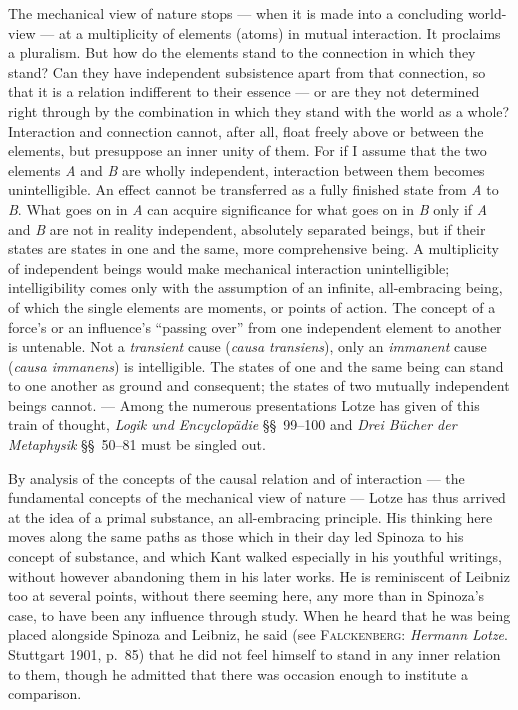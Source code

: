 \documentclass[12pt,a4paper]{book}
\newcommand{\opage}[1]{\marginnote{\footnotesize\textit{[#1]}}}
\begin{document}
The mechanical view of nature stops --- when it is made \opage{515}into a concluding
world-view --- at a multiplicity of elements (atoms) in mutual interaction. It
proclaims a pluralism. But how do the elements stand to the connection in which
they stand? Can they have independent subsistence apart from that connection, so
that it is a relation indifferent to their essence --- or are they not determined
right through by the combination in which they stand with the world as a whole?
Interaction and connection cannot, after all, float freely above or between the
elements, but presuppose an inner unity of them. For if I assume that the two
elements \textit{A} and \textit{B} are wholly independent, interaction between
them becomes unintelligible. An effect cannot be transferred as a fully finished
state from \textit{A} to \textit{B}. What goes on in \textit{A} can acquire
significance for what goes on in \textit{B} only if \textit{A} and \textit{B} are
not in reality independent, absolutely separated beings, but if their states are
states in one and the same, more comprehensive being. A multiplicity of
independent beings would make mechanical interaction unintelligible;
intelligibility comes only with the assumption of an infinite, all-embracing
being, of which the single elements are moments, or points of action. The
concept of a force's or an influence's ``passing over'' from one independent
element to another is untenable. Not a \emph{transient} cause (\textit{causa
transiens}), only an \emph{immanent} cause (\textit{causa immanens}) is
intelligible. The states of one and the same being can stand to one another as
ground and consequent; the states of two mutually independent beings cannot. ---
Among the numerous presentations Lotze has given of this train of thought,
\textit{Logik und Encyclopädie} §§~99--100 and \textit{Drei Bücher der
Metaphysik} §§~50--81 must be singled out.

By analysis of the concepts of the causal relation and of interaction --- the
fundamental concepts of the mechanical view of nature --- Lotze has thus arrived
at the idea of a primal substance, an all-embracing principle. His thinking here
moves along the same paths as those which in their day led Spinoza to his concept
of substance, and which Kant walked especially in his youthful writings, without
however abandoning them in his later works. He is reminiscent of Leibniz too at
several points, without there seeming here, any more \opage{516}than in Spinoza's case, to
have been any influence through study. When he heard that he was being placed
alongside Spinoza and Leibniz, he said (see \textsc{Falckenberg}:
\textit{Hermann Lotze}. Stuttgart 1901, p.~85) that he did not feel himself to
stand in any inner relation to them, though he admitted that there was occasion
enough to institute a comparison.
\end{document}
